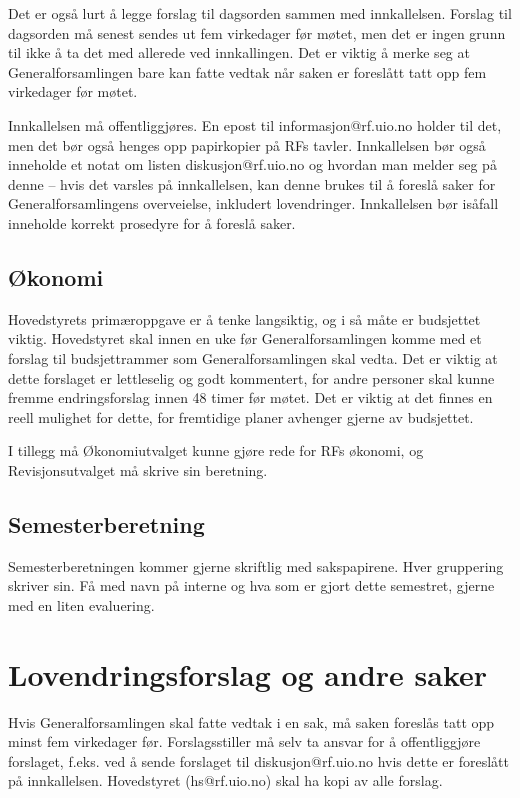 Det er også lurt å legge forslag til dagsorden sammen med innkallelsen. Forslag til dagsorden
må senest sendes ut fem virkedager før møtet, men det er ingen grunn til ikke å ta det med
allerede ved innkallingen. Det er viktig å merke seg at Generalforsamlingen bare kan fatte vedtak
når saken er foreslått tatt opp fem virkedager før møtet.

Innkallelsen må offentliggjøres. En epost til informasjon@rf.uio.no holder til det, men det 
bør også henges opp papirkopier på RFs tavler. Innkallelsen bør også inneholde et notat
om listen diskusjon@rf.uio.no og hvordan man melder seg på denne – hvis det varsles på 
innkallelsen, kan denne brukes til å foreslå saker for Generalforsamlingens overveielse,
inkludert lovendringer. Innkallelsen bør isåfall inneholde korrekt prosedyre for å foreslå
saker.

\subsection{Økonomi}
Hovedstyrets primæroppgave er å tenke langsiktig, og i så måte er budsjettet viktig.
Hovedstyret skal innen en uke før Generalforsamlingen komme med et forslag til budsjettrammer
som Generalforsamlingen skal vedta. Det er viktig at dette forslaget er lettleselig og godt
kommentert, for andre personer skal kunne fremme endringsforslag innen 48 timer før møtet.
Det er viktig at det finnes en reell mulighet for dette, for fremtidige planer avhenger
gjerne av budsjettet.

I tillegg må Økonomiutvalget kunne gjøre rede for RFs økonomi, og Revisjonsutvalget
må skrive sin beretning.

\subsection{Semesterberetning}
Semesterberetningen kommer gjerne skriftlig med sakspapirene. Hver gruppering skriver sin.
Få med navn på interne og hva som er gjort dette semestret, gjerne med en liten evaluering.

\section{Lovendringsforslag og andre saker}
Hvis Generalforsamlingen skal fatte vedtak i en sak, må saken foreslås tatt opp minst
fem virkedager før. Forslagsstiller må selv ta ansvar for å offentliggjøre forslaget, f.eks.
ved å sende forslaget til diskusjon@rf.uio.no hvis dette er foreslått på innkallelsen.
Hovedstyret (hs@rf.uio.no) skal ha kopi av alle forslag.

